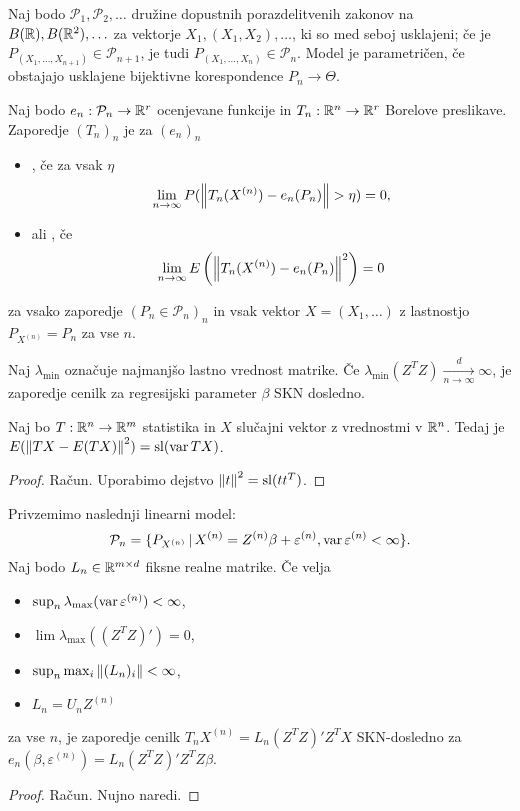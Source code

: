 Naj bodo $\mathcal{P}_1, \mathcal{P}_2, \ldots$ družine dopustnih
porazdelitvenih zakonov na $B(\mathbb{R}), B(\mathbb{R}^2), \ldots$ za vektorje $X_1, (X_1,
X_2), \ldots$, ki so med seboj usklajeni; če je $P_{(X_1, \ldots, X_{n+1})} \in
\mathcal{P}_{n+1}$, je tudi $P_{(X_1, \ldots, X_n)} \in \mathcal{P}_n$.
Model je parametričen, če obstajajo usklajene bijektivne korespondence $P_n \to
\Theta$.

\begin{definicija}
  Naj bodo $e_n: \mathcal{P}_n \to \mathbb{R}^r$ ocenjevane funkcije in $T_n: \mathbb{R}^n \to
  \mathbb{R}^r$ Borelove preslikave.
  Zaporedje $(T_n)_n$ je za $(e_n)_n$
  \begin{itemize}
  \item {}, če za vsak $\eta$
	\[
	  \lim_{n \to \infty} P(\left\lVert T_n(X^{(n)}) - e_n(P_n)\right\rVert > \eta) = 0,
	\]
  \item {} ali , če
	\[
	  \lim_{n \to \infty} E\left(\left\lVert T_n(X^{(n)}) - e_n(P_n)\right\rVert^2\right) = 0
	\]
  \end{itemize}
  za vsako zaporedje $(P_n \in \mathcal{P}_n)_n$ in vsak vektor $X = (X_1,
  \ldots)$ z lastnostjo $P_{X^{(n)}} = P_n$ za vse $n$.
\end{definicija}

\begin{izrek}
  Naj $\lambda_{\text{min}}$ označuje najmanjšo lastno vrednost matrike.
  Če $\lambda_{\text{min}}(Z^T Z) \xrightarrow[n \to \infty]{d}
  \infty$, je zaporedje cenilk za regresijski parameter $\beta$ SKN dosledno.
\end{izrek}

\begin{trditev}
  Naj bo $T: \mathbb{R}^n \to \mathbb{R}^m$ statistika in $X$ slučajni vektor z vrednostmi v
  $\mathbb{R}^n$.
  Tedaj je $E(\left\lVert TX - E(TX)\right\rVert^2) = \operatorname{sl}(\operatorname{var} TX)$.
\end{trditev}

\begin{proof}
  Račun.
  Uporabimo dejstvo $\left\lVert t\right\rVert^2 = \operatorname{sl}(t t^T)$.
\end{proof}

\begin{izrek}
  Privzemimo naslednji linearni model:
  \[
	\mathcal{P}_n = \{ P_{X^{(n)}} \,|\, X^{(n)} = Z^{(n)} \beta +
	\varepsilon^{(n)}, \operatorname{var} \varepsilon^{(n)} < \infty \}.
  \]
  Naj bodo $L_n \in \mathbb{R}^{m \times d}$ fiksne realne matrike.
  Če velja
  \begin{itemize}
  \item $\sup_n \lambda_{\text{max}}(\operatorname{var} \varepsilon^{(n)}) < \infty$,
  \item $\lim \lambda_{\text{max}}((Z^T Z)') = 0$,
  \item $\sup_n \max_i \left\lVert(L_n)_i\right\rVert < \infty$,
  \item $L_n = U_n Z^{(n)}$
  \end{itemize}
  za vse $n$, je zaporedje cenilk $T_n X^{(n)} = L_n(Z^T Z)' Z^T X$ SKN-dosledno
  za $e_n(\beta, \varepsilon^{(n)}) = L_n (Z^T Z)' Z^T Z \beta$.
\end{izrek}

\begin{proof}
  Račun.
  Nujno naredi.
\end{proof}

